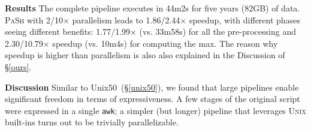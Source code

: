 \documentclass[sigplan, review, screen, anonymous]{acmart}
\newcommand{\heading}[1]{\vspace{4pt}\noindent\textbf{#1}\enspace}
\newcommand{\ttt}[1]{\texttt{#1}}
\newcommand{\todo}[1]{\hl{#1}\xspace}
\newcommand{\sx}[1]{(\S\ref{#1})}
\newcommand{\sys}{{\scshape PaSh}\xspace}
\newcommand{\unix}{{\scshape Unix}\xspace}
\begin{document}
\heading{Results}
The complete pipeline executes in 44m2s for five years (82GB) of data.
\sys with 2/10$\times$ parallelism leads to 1.86/2.44$\times$ speedup, with different phases seeing different benefits:
  1.77/1.99$\times$ (vs. 33m58s) for all the pre-processing and 
  2.30/10.79$\times$ speedup (vs. 10m4s) for computing the max.
The reason why speedup is higher than parallelism is also also explained in the Discussion of \S\ref{ours}.



\heading{Discussion}
Similar to Unix50~\sx{unix50}, we found that large pipelines enable significant freedom in terms of expressiveness.
A few stages of the original script were expressed in a single \ttt{awk};
  a simpler (but longer) pipeline that leverages \unix built-ins %
  turns out to be trivially parallelizable.

\end{document}
